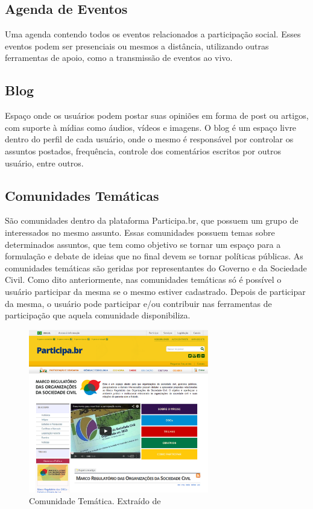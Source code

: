 \subsection{Agenda de Eventos}

Uma agenda contendo todos os eventos relacionados a participação social. Esses eventos podem ser presenciais ou mesmos a distância, utilizando outras ferramentas de apoio, como a transmissão de eventos ao vivo.

\subsection{Blog}

Espaço onde os usuários podem postar suas opiniões em forma de post ou artigos, com suporte à mídias como áudios, vídeos e imagens. O blog é um espaço livre dentro do perfil de cada usuário, onde o mesmo é responsável por controlar os assuntos postados, frequência, controle dos comentários escritos por outros usuário, entre outros.

\subsection{Comunidades Temáticas}

São comunidades dentro da plataforma Participa.br, que possuem um grupo de interessados no mesmo assunto. Essas comunidades possuem temas sobre determinados assuntos, que tem como objetivo se tornar um espaço para a formulação e debate de ideias que no final devem se tornar políticas públicas.
%
As comunidades temáticas são geridas por representantes do Governo e da Sociedade Civil. Como dito anteriormente, nas comunidades temáticas só é possível o usuário participar da mesma se o mesmo estiver cadastrado. Depois de participar da mesma, o usuário pode participar e/ou contribuir nas ferramentas de participação que aquela comunidade disponibiliza.

\graphicspath{{figuras/}}
\begin{figure}[H]
\centering
\includegraphics[width=0.7\textwidth]{comunidades-tematicas}
\caption{Comunidade Temática. Extraído de}
\label{fig:rails-architecture}
\end{figure}


